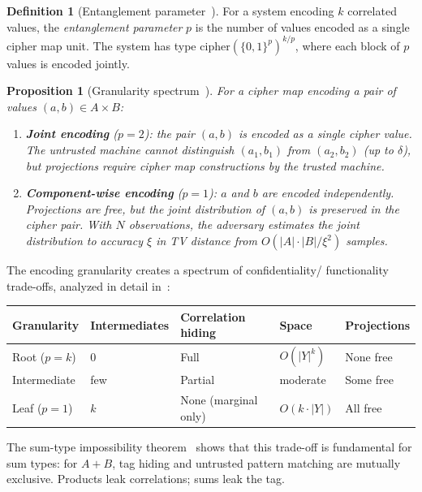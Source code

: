 \documentclass[11pt]{article}
\theoremstyle{definition}
\newtheorem{definition}{Definition}[section]
\theoremstyle{plain}
\newtheorem{proposition}[theorem]{Proposition}
\theoremstyle{remark}
\newcommand{\B}{\{0,1\}}
\begin{document}
\begin{definition}[Entanglement parameter~{\cite[Sec.~9]{towell2026cipher}}]
For a system encoding $k$ correlated values, the \emph{entanglement
parameter} $p$ is the number of values encoded as a single cipher map
unit.  The system has type $\mathrm{cipher}(\B^p)^{k/p}$, where each
block of $p$ values is encoded jointly.
\end{definition}

\begin{proposition}[Granularity spectrum~{\cite[Prop.~9.1]{towell2026cipher}}]
\label{prop:granularity}
For a cipher map encoding a pair of values $(a, b) \in A \times B$:
\begin{enumerate}
\item \textbf{Joint encoding} ($p = 2$): the pair $(a, b)$ is encoded as
  a single cipher value.  The untrusted machine cannot distinguish
  $(a_1, b_1)$ from $(a_2, b_2)$ (up to $\delta$), but projections
  require cipher map constructions by the trusted machine.

\item \textbf{Component-wise encoding} ($p = 1$): $a$ and $b$ are
  encoded independently.  Projections are free, but the joint distribution
  of $(a, b)$ is preserved in the cipher pair.  With $N$ observations, the
  adversary estimates the joint distribution to accuracy $\xi$ in TV
  distance from $O(|A| \cdot |B| / \xi^2)$ samples.
\end{enumerate}
\end{proposition}

The encoding granularity creates a spectrum of confidentiality/
functionality trade-offs, analyzed in detail
in~\cite{towell2026algebraic}:

\begin{center}
\begin{tabular}{@{}lllll@{}}
\toprule
Granularity & Intermediates & Correlation hiding & Space & Projections \\
\midrule
Root ($p = k$) & 0 & Full & $O(|Y|^k)$ & None free \\
Intermediate & few & Partial & moderate & Some free \\
Leaf ($p = 1$) & $k$ & None (marginal only) & $O(k \cdot |Y|)$ & All free \\
\bottomrule
\end{tabular}
\end{center}

The sum-type impossibility theorem~\cite[Thm.~4.1]{towell2026algebraic}
shows that this trade-off is fundamental for sum types: for
$A + B$, tag hiding and untrusted pattern matching are mutually
exclusive.  Products leak correlations; sums leak the tag.
\end{document}
